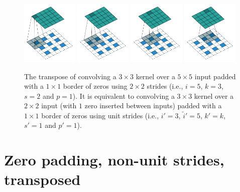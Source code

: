 \begin{figure}[p]
    \centering
    \includegraphics[width=0.24\textwidth]{pdf/padding_strides_transposed_00.pdf}
    \includegraphics[width=0.24\textwidth]{pdf/padding_strides_transposed_01.pdf}
    \includegraphics[width=0.24\textwidth]{pdf/padding_strides_transposed_02.pdf}
    \includegraphics[width=0.24\textwidth]{pdf/padding_strides_transposed_03.pdf}
    \caption{\label{fig:padding_strides_transposed} The transpose of convolving
        a $3 \times 3$ kernel over a $5 \times 5$ input padded with a $1 \times
        1$ border of zeros using $2 \times 2$ strides (i.e., $i = 5$, $k = 3$, $s
        = 2$ and $p = 1$). It is equivalent to convolving a $3 \times 3$ kernel
        over a $2 \times 2$ input (with $1$ zero inserted between inputs) padded
        with a $1 \times 1$ border of zeros using unit strides (i.e., $i' = 3$,
        $\tilde{i}' = 5$, $k' = k$, $s' = 1$ and $p' = 1$).}
\end{figure}

\section{Zero padding, non-unit strides, transposed}

